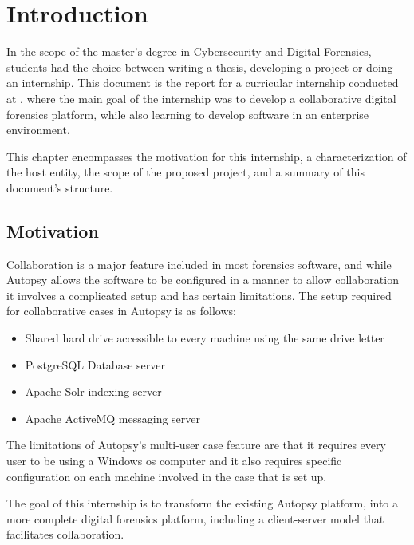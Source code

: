 
\chapter{Introduction}
\label{ch:introduction}

In the scope of the master's degree in Cybersecurity and Digital Forensics, students had the choice between writing a thesis, developing a project or doing an internship.
This document is the report for a curricular internship conducted at \company, where the main goal of the internship was to develop a collaborative digital forensics platform,
while also learning to develop software in an enterprise environment.

This chapter encompasses the motivation for this internship, a characterization of the host entity, the scope of the proposed project, and a summary of this document's structure.

\section{Motivation}

Collaboration is a major feature included in most forensics software, and while Autopsy \cite{autopsy} allows the software to be
configured in a manner to allow collaboration it involves a complicated setup and has certain limitations.
The setup required for collaborative cases in Autopsy is as follows:
\begin{itemize}
 \item Shared hard drive accessible to every machine using the same drive letter
 \item PostgreSQL \cite{postgresql} Database server 
 \item Apache Solr \cite{solr} indexing server
 \item Apache ActiveMQ \cite{activemq} messaging server
\end{itemize}

The limitations of Autopsy's multi-user case feature are that it requires every user to be using a Windows \acrfull{os} computer and it also requires specific configuration on each
machine involved in the case that is set up.

The goal of this internship is to transform the existing Autopsy platform, into a more complete digital forensics platform, including a client-server model that facilitates collaboration.

